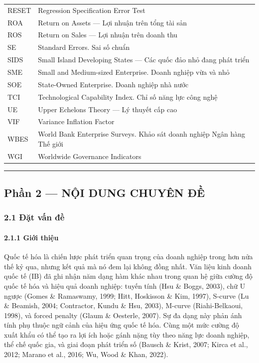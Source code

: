 \documentclass[12pt,a4paper]{article}
\begin{document}
\begin{longtable}[]{@{}ll@{}}
RESET & Regression Specification Error Test \\
ROA & Return on Assets --- Lợi nhuận trên tổng tài sản \\
ROS & Return on Sales --- Lợi nhuận trên doanh thu \\
SE & Standard Errors. Sai số chuẩn \\
SIDS & Small Island Developing States --- Các quốc đảo nhỏ đang phát
triển \\
SME & Small and Medium-sized Enterprise. Doanh nghiệp vừa và nhỏ \\
SOE & State-Owned Enterprise. Doanh nghiệp nhà nước \\
TCI & Technological Capability Index. Chỉ số năng lực công nghệ \\
UE & Upper Echelons Theory --- Lý thuyết cấp cao \\
VIF & Variance Inflation Factor \\
WBES & World Bank Enterprise Surveys. Khảo sát doanh nghiệp Ngân hàng
Thế giới \\
WGI & Worldwide Governance Indicators \\
\end{longtable}

\begin{center}\rule{0.5\linewidth}{0.5pt}\end{center}

\hypertarget{phux1ea7n-2--nux1ed9i-dung-chuyuxean-ux111ux1ec1}{%
\subsection{Phần 2 --- NỘI DUNG CHUYÊN
ĐỀ}\label{phux1ea7n-2--nux1ed9i-dung-chuyuxean-ux111ux1ec1}}

\hypertarget{21-ux111ux1eb7t-vux1ea5n-ux111ux1ec1}{%
\subsubsection{2.1 Đặt vấn
đề}\label{21-ux111ux1eb7t-vux1ea5n-ux111ux1ec1}}

\hypertarget{211-giux1edbi-thiux1ec7u}{%
\paragraph{2.1.1 Giới thiệu}\label{211-giux1edbi-thiux1ec7u}}

Quốc tế hóa là chiến lược phát triển quan trọng của doanh nghiệp trong
hơn nửa thế kỷ qua, nhưng kết quả mà nó đem lại không đồng nhất. Văn
liệu kinh doanh quốc tế (IB) đã ghi nhận năm dạng hàm khác nhau trong
quan hệ giữa cường độ quốc tế hóa và hiệu quả doanh nghiệp: tuyến tính
(Hsu \& Boggs, 2003), chữ U ngược (Gomes \& Ramaswamy, 1999; Hitt,
Hoskisson \& Kim, 1997), S-curve (Lu \& Beamish, 2004; Contractor, Kundu
\& Hsu, 2003), M-curve (Riahi-Belkaoui, 1998), và forced penalty (Glaum
\& Oesterle, 2007). Sự đa dạng này phản ánh tính phụ thuộc ngữ cảnh của
hiệu ứng quốc tế hóa. Cùng một mức cường độ xuất khẩu có thể tạo ra lợi
ích hoặc gánh nặng tùy theo năng lực doanh nghiệp, thể chế quốc gia, và
giai đoạn phát triển số (Bausch \& Krist, 2007; Kirca et al., 2012;
Marano et al., 2016; Wu, Wood \& Khan, 2022).
\end{document}
